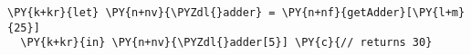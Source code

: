 \begin{Verbatim}[commandchars=\\\{\}]
\PY{k+kr}{let} \PY{n+nv}{\PYZdl{}adder} = \PY{n+nf}{getAdder}[\PY{l+m}{25}]
  \PY{k+kr}{in} \PY{n+nv}{\PYZdl{}adder[5}] \PY{c}{// returns 30}
\end{Verbatim}
